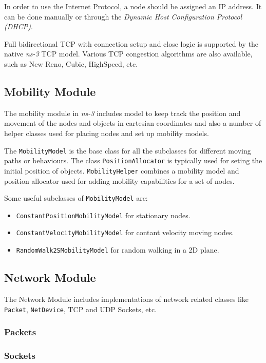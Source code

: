 In order to use the Internet Protocol, a node should be assigned an IP address. It can be done manually
or through the \textit{Dynamic Host Configuration Protocol (DHCP)}.

Full bidirectional TCP with connection setup and close logic is supported by the native \textit{ns-3} TCP model.
Various TCP congestion algorithms are also available, such as New Reno, Cubic, HighSpeed, etc.


\subsection{Mobility Module}
The mobility module in \textit{ns-3} includes model to keep track the position and movement of the nodes and objects 
in cartesian coordinates and also a number of helper classes used for placing nodes and set up mobility 
models.

The \texttt{MobilityModel} is the base class for all the subclasses for different moving paths or behaviours.
The class \texttt{PositionAllocator} is typically used for seting the initial position of objects. \texttt{MobilityHelper}
combines a mobility model and position allocator used for adding mobility capabilities for a set 
of nodes.

Some useful subclasses of \texttt{MobilityModel} are:
\begin{itemize}[noitemsep, topsep=0pt]
  \item \texttt{ConstantPositionMobilityModel} for stationary nodes.
  \item \texttt{ConstantVelocityMobilityModel} for contant velocity moving nodes.
  \item \texttt{RandomWalk2SMobilityModel} for random walking in a 2D plane.
\end{itemize}


\subsection{Network Module}
The Network Module includes implementations of network related classes like 
\texttt{Packet}, \texttt{NetDevice}, TCP and UDP Sockets, etc.

\subsubsection{Packets}

\subsubsection{Sockets}

